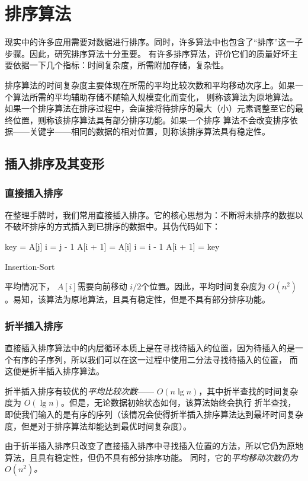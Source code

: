 \chapter{排序算法}
现实中的许多应用需要对数据进行排序。同时，许多算法中也包含了“排序”这一子步骤。因此，研究排序算法十分重要。
有许多排序算法，评价它们的质量好坏主要依据一下几个指标：时间复杂度，所需附加存储，复杂性。

排序算法的时间复杂度主要体现在所需的平均比较次数和平均移动次序上。如果一个算法所需的平均辅助存储不随输入规模变化而变化，
则称该算法为原地算法。如果一个排序算法在排序过程中，会直接将待排序的最大（小）元素调整至它的最终位置，则称该排序算法具有部分排序功能。如果一个排序
算法不会改变排序依据——关键字——相同的数据的相对位置，则称该排序算法具有稳定性。
\section{插入排序及其变形}
\subsection{直接插入排序}
在整理手牌时，我们常用直接插入排序。它的核心思想为：不断将未排序的数据以不破坏排序的方式插入到已排序的数据中。其伪代码如下：

\begin{algorithm}[H]
    \;
    {
        key = A[j]\;
        i = j - 1\;
        {
            A[i + 1] = A[i]\;
            i = i - 1\;
        }
        A[i + 1] = key\;
    }
    \caption{Insertion-Sort}
\end{algorithm}

平均情况下， $A[i]$需要向前移动 $i/2$个位置。因此，平均时间复杂度为 $O(n^2)$。易知，该算法为原地算法，且具有稳定性，但是不具有部分排序功能。
\subsection{折半插入排序}
直接插入排序算法中的内层循环本质上是在寻找待插入的位置，因为待插入的是一个有序的子序列，所以我们可以在这一过程中使用二分法寻找待插入的位置，
而这便是折半插入排序算法。

折半插入排序有较优的\emph{平均比较次数}—— $O(n\lg n)$，其中折半查找的时间复杂度为 $O(\lg n)$。但是，无论数据初始状态如何，该算法始终会执行
折半查找，即使我们输入的是有序的序列（该情况会使得折半插入排序算法达到最坏时间复杂度，但是对于排序算法却能达到最优时间复杂度）。

由于折半插入排序只改变了直接插入排序中寻找插入位置的方法，所以它仍为原地算法，且具有稳定性，但仍不具有部分排序功能。
同时，它的\emph{平均移动次数仍为 $O(n^2)$。}
